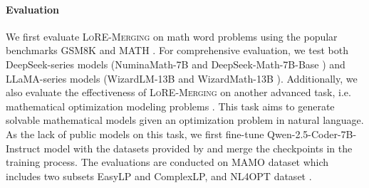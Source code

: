 \paragraph{Evaluation}
We first evaluate \textsc{LoRE-Merging} on math word problems using the popular benchmarks GSM8K \citep{cobbe_2021_training} and MATH \citep{hendrycks2measuring}.
For comprehensive evaluation, we test both DeepSeek-series models (NuminaMath-7B \citep{beeching_2024_numinamath} and DeepSeek-Math-7B-Base \citep{shao_2024_deepseekmath}) and LLaMA-series models (WizardLM-13B \citep{xu2023wizardlm} and WizardMath-13B \citep{luo2023wizardmath}).
Additionally, we also evaluate the effectiveness of \textsc{LoRE-Merging} on another advanced task, i.e. mathematical optimization modeling problems \citep{ramamonjison_2023_nl4opt, huang_2024_mamo, huang_2025_orlm}. This task aims to generate solvable mathematical models given an optimization problem in natural language. As the lack of public models on this task, we first fine-tune Qwen-2.5-Coder-7B-Instruct model \citep{hui_2024_qwen2} with the datasets provided by \citet{huang_2025_orlm} and merge the checkpoints in the training process. The evaluations are conducted on MAMO dataset \citep{huang_2024_mamo} which includes two subsets EasyLP and ComplexLP, and NL4OPT dataset \citep{ramamonjison_2023_nl4opt}.

